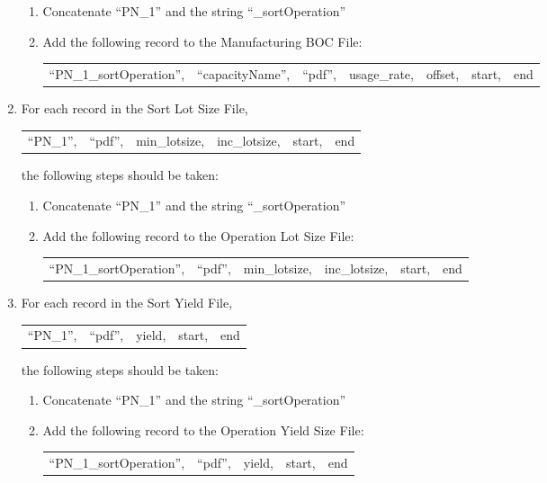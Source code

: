 \begin{enumerate}
\begin{enumerate}
\item Concatenate ``PN\_1'' and the string ``\_sortOperation''

\item Add the following record to the Manufacturing BOC File:
\begin{center}
\begin{tabular}{lllllll}
 ``PN\_1\_sortOperation'', &``capacityName'', &``pdf'', &usage\_rate, &offset,  &start, &end
\end{tabular}
\end{center}

\end{enumerate}
\vspace{.5in}

\item For each record in the Sort Lot Size File,
\begin{center}
\begin{tabular}{llllll}
  ``PN\_1'', &``pdf'', &min\_lotsize, &inc\_lotsize, &start, &end
\end{tabular}
\end{center}
the following steps should be taken:

\begin{enumerate}
\item Concatenate ``PN\_1'' and the string ``\_sortOperation''

\item Add the following record to the Operation Lot Size File:
\begin{center}
\begin{tabular}{llllll}
 ``PN\_1\_sortOperation'', &``pdf'', &min\_lotsize, &inc\_lotsize, &start, &end 
\end{tabular}
\end{center}

\end{enumerate}
\vspace{.5in}

\item For each record in the Sort Yield File,
\begin{center}
\begin{tabular}{lllll}
  ``PN\_1'', &``pdf'', &yield, &start, &end
\end{tabular}
\end{center}
the following steps should be taken:

\begin{enumerate}
\item Concatenate ``PN\_1'' and the string ``\_sortOperation''

\item Add the following record to the Operation Yield Size File:
\begin{center}
\begin{tabular}{lllll}
 ``PN\_1\_sortOperation'', &``pdf'', &yield, &start, &end
\end{tabular}
\end{center}
\end{enumerate}

\end{enumerate}
\vspace{.5in}





